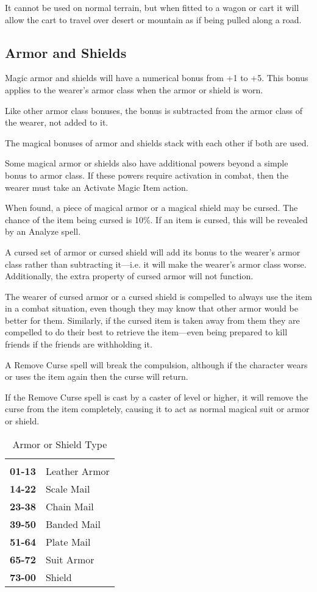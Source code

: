\begin{multicols*}{2}
It cannot be used on normal terrain, but when fitted to a wagon or cart it will allow the cart to travel over desert or mountain as if being pulled along a road.

\subsection{Armor and Shields}
Magic armor and shields will have a numerical bonus from +1 to +5. This bonus applies to the wearer’s armor class when the armor or shield is worn.

Like other armor class bonuses, the bonus is subtracted from the armor class of the wearer, not added to it.

The magical bonuses of armor and shields stack with each other if both are used.

Some magical armor or shields also have additional powers beyond a simple bonus to armor class. If these powers require activation in combat, then the wearer must take an Activate Magic Item action.

When found, a piece of magical armor or a magical shield may be cursed. The chance of the item being cursed is 10\%. If an item is cursed, this will be revealed by an Analyze spell.

A cursed set of armor or cursed shield will add its bonus to the wearer’s armor class rather than subtracting it—i.e. it will make the wearer’s armor class worse. Additionally, the extra property of cursed armor will not function.

The wearer of cursed armor or a cursed shield is compelled to always use the item in a combat situation, even though they may know that other armor would be better for them. Similarly, if the cursed item is taken away from them they are compelled to do their best to retrieve the item—even being prepared to kill friends if the friends are withholding it.

A Remove Curse spell will break the compulsion, although if the character wears or uses the item again then the curse will return.

If the Remove Curse spell is cast by a caster of  level or higher, it will remove the curse from the item completely, causing it to act as normal magical suit or armor or shield.

\begin {table}[H]
  \caption{Armor or Shield Type}
  \begin{tabularx}{\columnwidth}{>{\bfseries}YY}
	 & \\
	01-13 & Leather Armor\\
	14-22 & Scale Mail\\
	23-38 & Chain Mail\\
	39-50 & Banded Mail\\
	51-64 & Plate Mail\\
	65-72 & Suit Armor\\
	73-00 & Shield
  \end {tabularx}
\end {table}


\end{multicols*}
